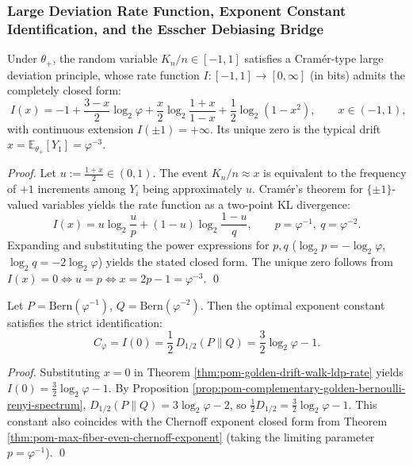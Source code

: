 \subsubsection{Large Deviation Rate Function, Exponent Constant Identification, and the Esscher Debiasing Bridge}

\begin{theorem}\label{thm:pom-golden-drift-walk-ldp-rate}
Under \(\theta_+\), the random variable \(K_n/n\in[-1,1]\) satisfies a Cram\'er-type large deviation principle, whose rate function \(I:[-1,1]\to[0,\infty]\) (in bits) admits the completely closed form:
\[
\boxed{\;
I(x)= -1+\frac{3-x}{2}\log_2\varphi+\frac{x}{2}\log_2\!\frac{1+x}{1-x}+\frac12\log_2(1-x^2),
\qquad x\in(-1,1),\;}
\]
with continuous extension \(I(\pm 1)=+\infty\).
Its unique zero is the typical drift \(x=\mathbb{E}_{\theta_+}[Y_1]=\varphi^{-3}\).
\end{theorem}

\begin{proof}
Let \(u:=\frac{1+x}{2}\in(0,1)\). The event \(K_n/n\approx x\) is equivalent to the frequency of \(+1\) increments among \(Y_i\) being approximately \(u\).
Cram\'er's theorem for \(\{\pm 1\}\)-valued variables yields the rate function as a two-point KL divergence:
\[
I(x)=u\log_2\frac{u}{p}+(1-u)\log_2\frac{1-u}{q},
\qquad p=\varphi^{-1},\ q=\varphi^{-2}.
\]
Expanding and substituting the power expressions for \(p,q\) (\(\log_2 p=-\log_2\varphi\), \(\log_2 q=-2\log_2\varphi\)) yields the stated closed form.
The unique zero follows from \(I(x)=0\iff u=p\iff x=2p-1=\varphi^{-3}\). \qed
\end{proof}

\begin{corollary}[Triple identification of the error exponent: Chernoff constant = zero-drift large deviation = half of the order-\texorpdfstring{$1/2$}{1/2} R\'enyi divergence]\label{cor:pom-error-exponent-triple-identity}
Let \(P=\mathrm{Bern}(\varphi^{-1})\), \(Q=\mathrm{Bern}(\varphi^{-2})\).
Then the optimal exponent constant satisfies the strict identification:
\[
\boxed{\;
C_\varphi
=I(0)
=\frac12\,D_{1/2}(P\|Q)
=\frac32\log_2\varphi-1.\;}
\]
\end{corollary}

\begin{proof}
Substituting \(x=0\) in Theorem \ref{thm:pom-golden-drift-walk-ldp-rate} yields \(I(0)=\frac32\log_2\varphi-1\).
By Proposition \ref{prop:pom-complementary-golden-bernoulli-renyi-spectrum},
\(
D_{1/2}(P\|Q)=3\log_2\varphi-2
\), so \(\frac12 D_{1/2}=\frac32\log_2\varphi-1\).
This constant also coincides with the Chernoff exponent closed form from Theorem \ref{thm:pom-max-fiber-even-chernoff-exponent} (taking the limiting parameter \(p=\varphi^{-1}\)). \qed
\end{proof}

